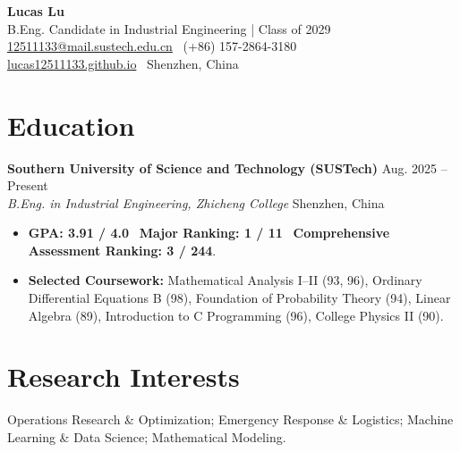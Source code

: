 \documentclass[10pt,a4paper]{article}
\begin{document}
\begin{center}
    {\huge\bfseries Lucas Lu}\\[-1pt]
    B.Eng. Candidate in Industrial Engineering | Class of 2029\\[2pt]
    \href{mailto:12511133@mail.sustech.edu.cn}{12511133@mail.sustech.edu.cn} \textbar\ (+86) 157-2864-3180\\
    \href{https://lucas12511133.github.io}{lucas12511133.github.io} \textbar\ Shenzhen, China
\end{center}
\vspace{-5pt}

\section{Education}
\textbf{Southern University of Science and Technology (SUSTech)} \hfill Aug. 2025 -- Present\\
\textit{B.Eng. in Industrial Engineering, Zhicheng College} \hfill Shenzhen, China
\begin{itemize}
    \item \textbf{GPA: 3.91 / 4.0} \textbar\ \textbf{Major Ranking: 1 / 11} \textbar\ \textbf{Comprehensive Assessment Ranking: 3 / 244}.
    \item \textbf{Selected Coursework:} Mathematical Analysis I--II (93, 96), Ordinary Differential Equations B (98), Foundation of Probability Theory (94), Linear Algebra (89), Introduction to C Programming (96), College Physics II (90).
\end{itemize}

\section{Research Interests}
Operations Research \& Optimization; Emergency Response \& Logistics; Machine Learning \& Data Science; Mathematical Modeling.
\end{document}
